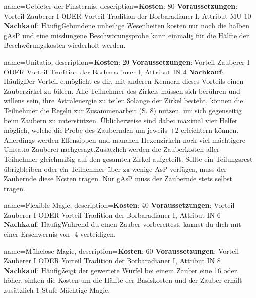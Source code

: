 {
    name={Gebieter der Finsternis},
    description={\textbf{Kosten}: 80 \textbf{Voraussetzungen}: Vorteil Zauberer I ODER Vorteil Tradition der Borbaradianer I, Attribut MU 10 \textbf{Nachkauf}: Häufig\newline Gebundene unheilige Wesenheiten kosten nur noch die halben gAsP und eine misslungene Beschwörungsprobe kann einmalig für die Hälfte der Beschwörungskosten wiederholt werden.}
}


{
    name={Unitatio},
    description={\textbf{Kosten}: 20 \textbf{Voraussetzungen}: Vorteil Zauberer I ODER Vorteil Tradition der Borbaradianer I, Attribut IN 4 \textbf{Nachkauf}: Häufig\newline Der Vorteil ermöglicht es dir, mit anderen Kennern dieses Vorteils einen Zauberzirkel zu bilden. Alle Teilnehmer des Zirkels müssen sich berühren und willens sein, ihre Astralenergie zu teilen.\newline Solange der Zirkel besteht, können die Teilnehmer die Regeln zur Zusammenarbeit (S. 8) nutzen, um sich gegenseitig beim Zaubern zu unterstützen. Üblicherweise sind dabei maximal vier Helfer möglich, welche die Probe des Zaubernden um jeweils +2 erleichtern können. Allerdings werden Elfensippen und manchen Hexenzirkeln noch viel mächtigere Unitatio-Zauberei nachgesagt.\newline Zusätzlich werden die Zauberkosten aller Teilnehmer gleichmäßig auf den gesamten Zirkel aufgeteilt. Sollte ein Teilungsrest übrigbleiben oder ein Teilnehmer über zu wenige AsP verfügen, muss der Zaubernde diese Kosten tragen. Nur gAsP muss der Zaubernde stets selbst tragen.}
}


{
    name={Flexible Magie},
    description={\textbf{Kosten}: 40 \textbf{Voraussetzungen}: Vorteil Zauberer I ODER Vorteil Tradition der Borbaradianer I, Attribut IN 6 \textbf{Nachkauf}: Häufig\newline Während du einen Zauber vorbereitest, kannst du dich mit einer Erschwernis von -4 verteidigen.}
}


{
    name={Mühelose Magie},
    description={\textbf{Kosten}: 60 \textbf{Voraussetzungen}: Vorteil Zauberer I ODER Vorteil Tradition der Borbaradianer I, Attribut IN 8 \textbf{Nachkauf}: Häufig\newline Zeigt der gewertete Würfel bei einem Zauber eine 16 oder höher, sinken die Kosten um die Hälfte der Basiskosten und der Zauber erhält zusätzlich 1 Stufe Mächtige Magie.}
}


